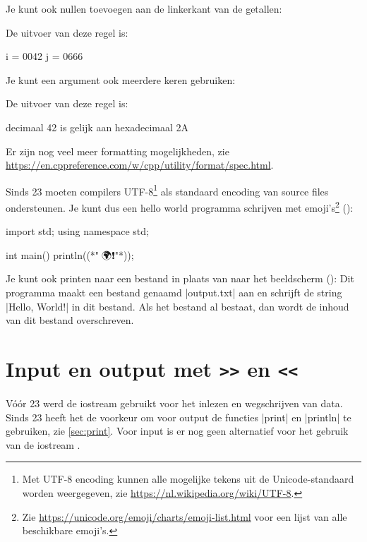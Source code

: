 \begin{cpplstShortInline}
Je kunt ook nullen toevoegen aan de linkerkant van de getallen:

De uitvoer van deze regel is:
\begin{coutput}
i = 0042
j = 0666
\end{coutput}

Je kunt een argument ook meerdere keren gebruiken:

De uitvoer van deze regel is:
\begin{coutput}
decimaal 42 is gelijk aan hexadecimaal 2A
\end{coutput}
Er zijn nog veel meer formatting mogelijkheden, zie \url{https://en.cppreference.com/w/cpp/utility/format/spec.html}.

Sinds \Cpp{}23 moeten compilers UTF-8\footnote{%
	Met UTF-8 encoding kunnen alle mogelijke tekens uit de Unicode-standaard worden weergegeven, zie \url{https://nl.wikipedia.org/wiki/UTF-8}.
} als standaard encoding van source files ondersteunen.
Je kunt dus een hello world programma schrijven met emoji's\footnote{%
	Zie \url{https://unicode.org/emoji/charts/emoji-list.html} voor een lijst van alle beschikbare emoji's.
} ():
\begin{cpplstfragment}[escapeinside={(*}{*)}]
import std;
using namespace std;

int main() {
	println((*"🙋🌍❗"*));
}
\end{cpplstfragment}

Je kunt ook printen naar een bestand in plaats van naar het beeldscherm ():
Dit programma maakt een bestand genaamd |output.txt| aan en schrijft de string |Hello, World!| in dit bestand.
Als het bestand al bestaat, dan wordt de inhoud van dit bestand overschreven.

\section[Input en output met \texttt{>{}>} en \texttt{<{}<}]{Input en output met \texorpdfstring{\texttt{>{}>}}{>>} en \texorpdfstring{\texttt{<{}<}}{<<}}
\label{sec:iostream}
Vóór \Cpp{}23 werd de iostream  gebruikt voor het inlezen en wegschrijven van data.
Sinds \Cpp{}23 heeft het de voorkeur om voor output de functies |print| en |println| te gebruiken, zie \cref{sec:print}.
Voor input is er nog geen alternatief voor het gebruik van de iostream .


\end{cpplstShortInline}

